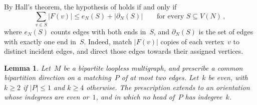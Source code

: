 \documentclass[12pt,reqno,a4paper]{amsart}
\newtheorem{lemma}[theorem]{Lemma}
\begin{document}
By Hall's theorem, the hypothesis of  holds if and only if
\begin{equation}\label{eq:hall}
  \sum_{v \in S} |F(v)| \le e_N(S) + |\partial_N(S)|
    \qquad\text{for every }S \subseteq V(N) \, ,
\end{equation}
where $e_N(S)$ counts edges with both ends in~$S$, and $\partial_N(S)$ is the
set of edges with exactly one end in~$S$.
Indeed, match $|F(v)|$ copies of each vertex~$v$ to distinct incident edges,
and direct those edges towards their assigned vertices.

\begin{lemma}\label{lem:marked}
  Let~$M$ be a bipartite loopless multigraph, and prescribe a common
  bipartition direction on a matching~$P$ of at most two edges.
  Let~$k$ be even, with $k \ge 2$ if $|P| \le 1$ and $k \ge 4$ otherwise.
  The prescription extends to an orientation whose indegrees are even or~$1$,
  and in which no head of~$P$ has indegree~$k$.
\end{lemma}
\end{document}
